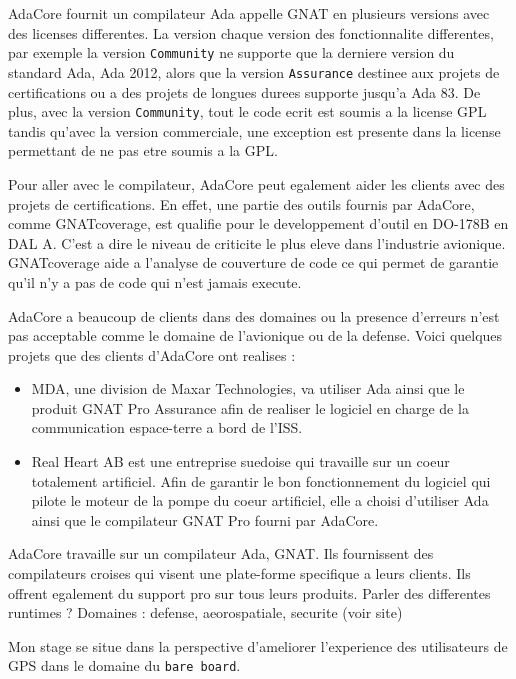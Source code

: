\documentclass[11pt,]{article}
\begin{document}
AdaCore fournit un compilateur Ada appelle GNAT en plusieurs versions
avec des licenses differentes. La version chaque version des
fonctionnalite differentes, par exemple la version \texttt{Community} ne
supporte que la derniere version du standard Ada, Ada 2012, alors que la
version \texttt{Assurance} destinee aux projets de certifications ou a
des projets de longues durees supporte jusqu'a Ada 83. De plus, avec la
version \texttt{Community}, tout le code ecrit est soumis a la license
GPL tandis qu'avec la version commerciale, une exception est presente
dans la license permettant de ne pas etre soumis a la GPL.

Pour aller avec le compilateur, AdaCore peut egalement aider les clients
avec des projets de certifications. En effet, une partie des outils
fournis par AdaCore, comme GNATcoverage, est qualifie pour le
developpement d'outil en DO-178B en DAL A. C'est a dire le niveau de
criticite le plus eleve dans l'industrie avionique. GNATcoverage aide a
l'analyse de couverture de code ce qui permet de garantie qu'il n'y a
pas de code qui n'est jamais execute.

AdaCore a beaucoup de clients dans des domaines ou la presence d'erreurs
n'est pas acceptable comme le domaine de l'avionique ou de la defense.
Voici quelques projets que des clients d'AdaCore ont realises :

\begin{itemize}
\item
  MDA, une division de Maxar Technologies, va utiliser Ada ainsi que le
  produit GNAT Pro Assurance afin de realiser le logiciel en charge de
  la communication espace-terre a bord de l'ISS.
\item
  Real Heart AB est une entreprise suedoise qui travaille sur un coeur
  totalement artificiel. Afin de garantir le bon fonctionnement du
  logiciel qui pilote le moteur de la pompe du coeur artificiel, elle a
  choisi d'utiliser Ada ainsi que le compilateur GNAT Pro fourni par
  AdaCore.
\end{itemize}

AdaCore travaille sur un compilateur Ada, GNAT. Ils fournissent des
compilateurs croises qui visent une plate-forme specifique a leurs
clients. Ils offrent egalement du support pro sur tous leurs produits.
Parler des differentes runtimes ? Domaines : defense, aeorospatiale,
securite (voir site)

Mon stage se situe dans la perspective d'ameliorer l'experience des
utilisateurs de GPS dans le domaine du \texttt{bare\ board}.
\end{document}
